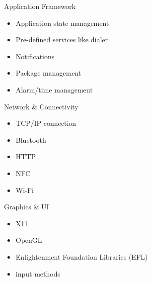 \documentclass[presentation,aspectratio=43,12pt]{beamer}
\begin{document}
\begin{frame}[label=sec-3-4]{Application Framework}
\begin{itemize}
\item Application state management
\item Pre-defined services like dialer
\item Notifications
\item Package management
\item Alarm/time management
\end{itemize}
\end{frame}
\begin{frame}[label=sec-3-5]{Network \& Connectivity}
\begin{itemize}
\item TCP/IP connection
\item Bluetooth
\item HTTP
\item NFC
\item Wi-Fi
\end{itemize}

\end{frame}
\begin{frame}[label=sec-3-6]{Graphics \& UI}
\begin{itemize}
\item X11
\item OpenGL
\item Enlightenment Foundation Libraries (EFL)
\item input methods
\end{itemize}

\end{frame}
\end{document}
